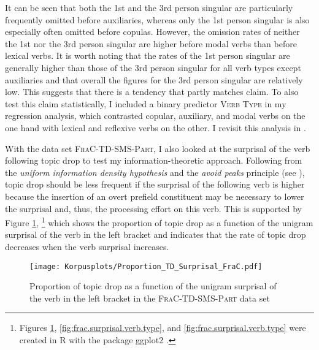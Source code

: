 It can be seen that both the 1st and the 3rd person singular are particularly frequently omitted before auxiliaries, whereas only the 1st person singular is also especially often omitted before copulas.
However, the omission rates of neither the 1st nor the 3rd person singular are higher before modal verbs than before lexical verbs.
It is worth noting that the rates of the 1st person singular are generally higher than those of the 3rd person singular for all verb types except auxiliaries and that overall the figures for the 3rd person singular are relatively low.
This suggests that there is a tendency that partly matches  claim.
To also test this claim statistically, I included a binary predictor \textsc{Verb Type} in my regression analysis, which contrasted copular, auxiliary, and modal verbs on the one hand with lexical and reflexive verbs on the other. 
I revisit this analysis in .
    

With the data set \textsc{FraC-TD-SMS-Part}, I also looked at the surprisal of the verb following topic drop to test my information-theoretic approach.
Following from the \textit{uniform information density hypothesis}  and the \textit{avoid peaks} principle (see ), topic drop should be less frequent if the surprisal of the following verb is higher because the insertion of an overt prefield constituent may be necessary to lower the surprisal and, thus, the processing effort  on this verb.
This is supported by Figure \ref{fig:frac.surprisal.density},%
\footnote{Figures \ref{fig:frac.surprisal.density}, \ref{fig:frac.surprisal.verb.type}, and \ref{fig:frac.surprisal.verb.type} were created in R with the package ggplot2 \citep{wickham2016}.}
%
which shows the proportion of topic drop as a function of the unigram surprisal of the verb in the left bracket and indicates that the rate of topic drop decreases when the verb surprisal increases.

\begin{figure}
\centering
\texttt{[image: Korpusplots/Proportion\_TD\_Surprisal\_FraC.pdf]}
\caption[Distribution of the verb surprisal in \textsc{FraC-TD-SMS-Part}]{Proportion of topic drop as a function of the unigram surprisal of the verb in the left bracket in the \textsc{FraC-TD-SMS-Part} data set} 
\label{fig:frac.surprisal.density}
\end{figure}

